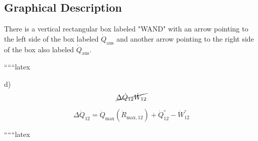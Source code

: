 \subsection*{Graphical Description}
There is a vertical rectangular box labeled "WAND" with an arrow pointing to the left side of the box labeled $\dot{Q}_{\text{aus}}$ and another arrow pointing to the right side of the box also labeled $\dot{Q}_{\text{aus}}$.

``````latex


d)
\[
\cancel{\Delta \dot{Q}_{12} \dot{W}_{12}}
\]

\[
\Delta \dot{Q}_{12} = \dot{Q}_{\text{max}} (\dot{R}_{\text{max},12}) + \dot{Q}_{12}^{\circ} - \dot{W}_{12}^{\circ}
\]

``````latex


